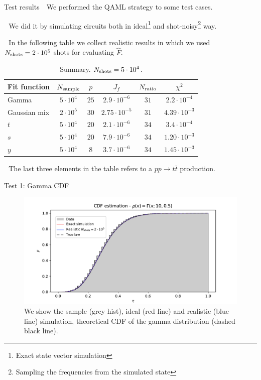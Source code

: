 \documentclass[8pt, xcolor={svgnames}, hyperref={colorlinks, linkcolor=black, citecolor=amethyst, urlcolor=amethyst}]{beamer}
\begin{document}
\begin{frame}{Test results}
\large 
\faArrowCircleRight\,\, We performed the QAML strategy to some test cases.
\pause 

\faArrowCircleRight\,\, We did it by simulating circuits both in ideal\footnote<2->{Exact
state vector simulation} and shot-noisy\footnote<2->{Sampling the frequencies from the
simulated state} way. 
\pause 

\faArrowCircleRight\,\, In the following table we collect realistic results in which we used 
$N_{\rm shots}=2\cdot 10^{5}$ shots for evaluating $\hat{F}$.
\begin{table}
  \begin{tabular}{lccccc}
  \hline \hline
    Fit function & $N_{\rm sample}$ & $p$ & $J_f$ & $N_{\rm ratio}$ & $\chi^2$\\
  \hline
    Gamma & $5 \cdot 10^4$ & $25$ & $2.9 \cdot 10^{-6}$ & $31$ & $2.2\cdot10^{-4}$ \\
    Gaussian mix & $2 \cdot 10^5$ & $30$ & $2.75 \cdot 10^{-5}$ & $31$ & $4.39 \cdot 10^{-3}$ \\
    $t$ & $5\cdot 10^4$ & $20$ & $2.1 \cdot 10^{-6}$ & $34$ & $3.4 \cdot 10^{-4}$ \\
    $s$ & $5\cdot 10^4$ & $20$ & $7.9 \cdot 10^{-6}$ & $34$ & $1.20 \cdot 10^{-3}$\\
    $y$ & $5\cdot 10^4$ & $8$ & $3.7 \cdot 10^{-6}$ & $34$ & $1.45 \cdot 10^{-3}$\\
  \hline \hline
  \end{tabular}
  \caption{\label{tab:summary}Summary. $N_{\rm shots} = 5 \cdot 10^4$.}
  \end{table}
\pause 
\faArrowCircleRight\,\, The last three elements in the table refers to a $pp\to t\bar{t}$
production.
\end{frame}

\begin{frame}[fragile]{Test 1: Gamma CDF}
\begin{figure}
  \centering
  \includegraphics[width=1\linewidth]{figures/CDF_Gamma_25_20_200000.pdf}
  \caption{We show the sample (grey hist), ideal (red line) and realistic 
  (blue line) simulation, theoretical CDF of the gamma distribution (dashed black
  line).}
\end{figure}
\end{frame}
\end{document}
